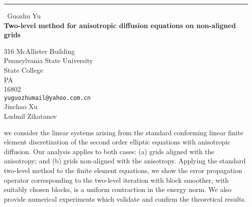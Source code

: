 \documentclass{report}
\begin{document}
\begin{center}
\rule{6in}{1pt} \
{\large Guozhu Yu \\
{\bf Two-level method for anisotropic diffusion equations on non-aligned grids}}

316 McAllister Building \\ Pennsylvania State University \\ State College \\ PA \\ 16802
\\
{\tt yuguozhumail@yahoo.com.cn}\\
Jinchao Xu\\
Ludmil Zikatanov\end{center}

we consider the linear systems arising from the standard conforming
linear finite element discretization of the second order elliptic
equations with anisotropic diffusion. Our analysis applies to both cases:
(a) grids aligned with the anisotropy; and (b) grids non-aligned with the
anisotropy. Applying the standard two-level method to the finite element
equations, we show the error propagation operator corresponding to the
two-level iteration with block smoother, with suitably chosen blocks, is
a uniform contraction in the energy norm. We also provide numerical
experiments which validate and confirm the theoretical results.
\end{document}
